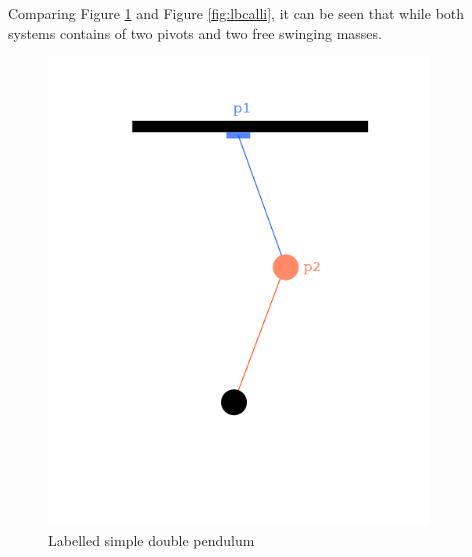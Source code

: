 \documentclass[a4paper,12pt]{article}
\begin{document}
Comparing Figure \ref{fig:lbdbpendulum} and Figure \ref{fig:lbcalli}, it can be seen that while both systems contains of two pivots and two free swinging masses.
\begin{figure}[H]
    \centering
    \begin{minipage}{0.45\textwidth}
        \centering
        \includegraphics[width=0.9\textwidth]{labelled_double_pendulum} %
        \caption{Labelled simple double pendulum}
        \label{fig:lbdbpendulum}
    \end{minipage}\hfill
    \begin{minipage}{0.45\textwidth}
        \centering

\end{minipage}
\end{figure}
\end{document}
